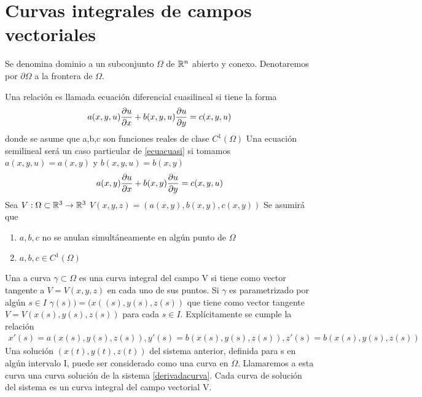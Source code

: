 \section{Curvas integrales de campos vectoriales}
\begin{Def}
    Se denomina dominio a un subconjunto $\Omega$ de ${\mathbb{R}}^n$ abierto y conexo. Denotaremos por $\partial\Omega$ a la frontera de $\Omega$.
\end{Def}
Una relación es llamada ecuación diferencial cuasilineal si tiene la forma
\begin{eqnarray}
    \label{ecuacuasi}
    a(x,y,u)\frac{\partial u}{\partial x}+b(x,y,u)\frac{\partial u}{\partial y}=c(x,y,u)
\end{eqnarray}
donde se asume que a,b,c son funciones reales de clase $C^1(\Omega)$
Una ecuación semilineal será un caso particular de \ref{ecuacuasi} si tomamos $a(x,y,u)=a(x,y)$ y $b(x,y,u)=b(x,y)$
\begin{eqnarray}
\label{ecuasemi} 
a(x,y)\frac{\partial u}{\partial x}+b(x,y)\frac{\partial u}{\partial y}=c(x,y,u) 
\end{eqnarray}
Sea $V:\Omega\subset{\mathbb{R}}^3\rightarrow{\mathbb{R}}^3$ $V(x,y,z)=(a(x,y),b(x,y),c(x,y))$
Se asumirá que 
\begin{enumerate}
    \item  $a,b,c$ no se anulan simultáneamente en algún punto de $\Omega$
    \item $a,b,c\in C^1(\Omega)$
\end{enumerate}
\begin{Def}
    Una a curva $\gamma\subset\Omega$ es una curva integral del campo V si tiene como vector tangente a $V=V(x,y,z)$ en cada uno de sus puntos. Si $\gamma$ es parametrizado por algún $s\in I$
    $\gamma(s))=(x((s),y(s),z(s))$ que tiene como vector tangente $V=V(x(s),y(s),z(s))$ para cada $s\in I$.
    Explícitamente se cumple la relación 
    \begin{eqnarray}
        x'(s)=a(x(s),y(s),z(s)) , y'(s)=b(x(s),y(s),z(s)) , z'(s)=b(x(s),y(s),z(s))\label{derivadacurva}
    \end{eqnarray}
    Una solución $(x (t), y (t), z (t))$ del sistema anterior, definida para s en algún intervalo I, puede ser considerado como una curva en $\Omega$. Llamaremos a esta curva una curva solución de la
    sistema \ref{derivadacurva}. Cada curva de solución del sistema es un
    curva integral del campo vectorial V.
\end{Def}